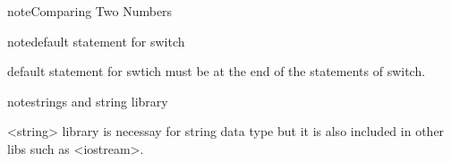 \documentclass[letterpaper,12pt,english]{sphinxmanual}
\begin{document}
\begin{sphinxadmonition}{note}{Comparing Two Numbers}

\begin{sphinxVerbatim}[commandchars=\\\{\}]
      
\end{sphinxVerbatim}
\end{sphinxadmonition}

\begin{sphinxadmonition}{note}{default statement for switch}

default statement for swtich must be at the end of the statements of switch.

\begin{sphinxVerbatim}[commandchars=\\\{\}]
   
  
   
      
   
      
      
\end{sphinxVerbatim}
\end{sphinxadmonition}

\begin{sphinxadmonition}{note}{strings and string library}

\textless{}string\textgreater{} library is necessay for string data type but it is also included in other libs such as \textless{}iostream\textgreater{}.
\end{sphinxadmonition}
\end{document}
